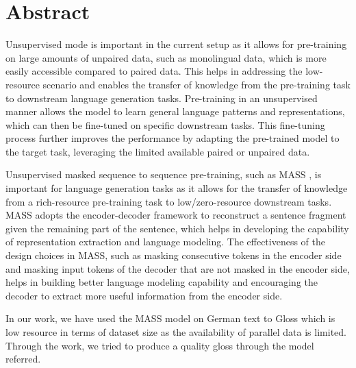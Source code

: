 \section{Abstract} \label{sec:abstract}

Unsupervised mode is important in the current setup as it allows for pre-training on large amounts of unpaired data, such as monolingual data, which is more easily accessible compared to paired data. This helps in addressing the low-resource scenario and enables the transfer of knowledge from the pre-training task to downstream language generation tasks. Pre-training in an unsupervised manner allows the model to learn general language patterns and representations, which can then be fine-tuned on specific downstream tasks. This fine-tuning process further improves the performance by adapting the pre-trained model to the target task, leveraging the limited available paired or unpaired data.

Unsupervised masked sequence to sequence pre-training, such as MASS \cite{ref_paper}, is important for language generation tasks as it allows for the transfer of knowledge from a rich-resource pre-training task to low/zero-resource downstream tasks. MASS adopts the encoder-decoder framework to reconstruct a sentence fragment given the remaining part of the sentence, which helps in developing the capability of representation extraction and language modeling. The effectiveness of the design choices in MASS, such as masking consecutive tokens in the encoder side and masking input tokens of the decoder that are not masked in the encoder side, helps in building better language modeling capability and encouraging the decoder to extract more useful information from the encoder side. 

In our work, we have used the MASS model on German text to Gloss which is low resource in terms of dataset size as the availability of parallel data is limited. Through the work, we tried to produce a quality gloss through the model referred.  



